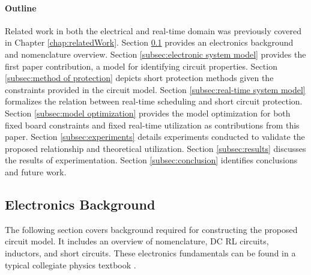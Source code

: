 \paragraph{Outline}
Related work in both the electrical and real-time domain was previously covered in Chapter \ref{chap:relatedWork}.
Section \ref{subsec:electronics background} provides an electronics background and nomenclature overview.
Section \ref{subsec:electronic system model} provides the first paper contribution, a model for identifying circuit properties.
Section \ref{subsec:method of protection} depicts short protection methods given the constraints provided in the circuit model.
Section \ref{subsec:real-time system model} formalizes the relation between real-time scheduling and short circuit protection.
Section \ref{subsec:model optimization} provides the model optimization for both fixed board constraints and fixed real-time utilization as contributions from this paper.
Section \ref{subsec:experiments} details experiments conducted to validate the proposed relationship and theoretical utilization.
Section \ref{subsec:results} discusses the results of experimentation.
Section \ref{subsec:conclusion} identifies conclusions and future work.



\clearpage \subsection{Electronics Background}\label{subsec:electronics background}
The following section covers background required for constructing the proposed circuit model.
It includes an overview of nomenclature, DC RL circuits, inductors, and short circuits.
These electronics fundamentals can be found in a typical collegiate physics textbook \cite{young_sears_2012}.

